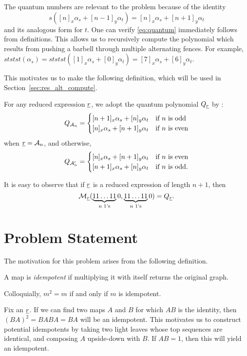 The quantum numbers are relevant to the problem because of the identity
\begin{equation}
	s([n]_x\alpha_s + [n-1]_y\alpha_t) = [n]_x\alpha_s + [n+1]_y\alpha_t
	\label{eq:quantum}
\end{equation}
and its analogous form for $t$.  One can verify \eqref{eq:quantum} immediately follows from definitions.  This allows us to recursively compute the polynomial which results from pushing a barbell through multiple alternating fences.  For example, $ststst(\alpha_s) = ststst([1]_x\alpha_s + [0]_y\alpha_t) = [7]_x\alpha_s + [6]_y\alpha_t$.

This motivates us to make the following definition, which will be used in Section~\ref{sec:res_alt_compute}.
\begin{definition*}
	For any reduced expression $\ul r$, we adopt the quantum polynomial $Q_{\ul r}$ by :
	\[
		Q_{\AA_n} = 
		\begin{cases}
			[n+1]_x \alpha_s + [n]_y \alpha_t & \text{if $n$ is odd} \\
			[n]_x \alpha_s + [n+1]_y \alpha_t & \text{if $n$ is even}
		\end{cases}
	\]
	when $\ul r = \AA_n$, and otherwise,
	\[
		Q_{\AA_n'} =
		\begin{cases}
			[n]_x \alpha_s + [n+1]_y \alpha_t & \text{if $n$ is even} \\
			[n+1]_x \alpha_s + [n]_y \alpha_t & \text{if $n$ is odd}.
		\end{cases}
	\]
\end{definition*}

It is easy to observe that if $\ul r$ is a reduced expression of length $n+1$, then \[ \MM_{\ul r} ( \underbrace{11\dots11}_{\text{$n$ 1's}}0, \underbrace{11\dots11}_{\text{$n$ 1's}}0 ) = Q_{\ul r}. \]


\section{Problem Statement}
\label{sec:probstate}

The motivation for this problem arises from the following definition.
\begin{definition*}
	A map is \emph{idempotent} if multiplying it with itself returns the original graph.
\end{definition*}
Colloquially, $m^2=m$ if and only if $m$ is idempotent.

Fix an $\ul r$.  If we can find two maps $A$ and $B$ for which $AB$ is the identity, then $(BA)^2=BABA=BA$ will be an idempotent.  This motivates us to construct potential idempotents by taking two light leaves whose top sequences are identical, and composing $A$ upside-down with $B$.  If $AB=1$, then this will yield an idempotent.


